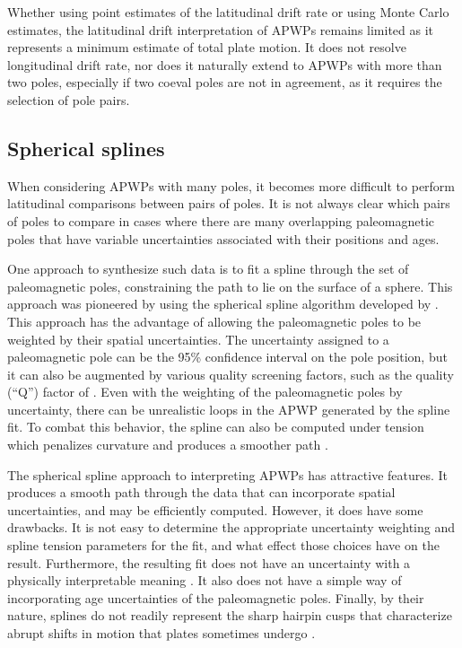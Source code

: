 \documentclass[]{agujournal2019}
\begin{document}
Whether using point estimates of the latitudinal drift rate or using Monte Carlo estimates, the latitudinal drift interpretation of APWPs remains limited as it represents a minimum estimate of total plate motion. It does not resolve longitudinal drift rate, nor does it naturally extend to APWPs with more than two poles, especially if two coeval poles are not in agreement, as it requires the selection of pole pairs.

\subsection{Spherical splines}
When considering APWPs with many poles, it becomes more difficult to perform latitudinal comparisons between pairs of poles. It is not always clear which pairs of poles to compare in cases where there are many overlapping paleomagnetic poles that have variable uncertainties associated with their positions and ages.

One approach to synthesize such data is to fit a spline through the set of paleomagnetic poles, constraining the path to lie on the surface of a sphere. This approach was pioneered by  using the spherical spline algorithm developed by . This approach has the advantage of allowing the paleomagnetic poles to be weighted by their spatial uncertainties. The uncertainty assigned to a paleomagnetic pole can be the 95\% confidence interval on the pole position, but it can also be augmented by various quality screening factors, such as the quality (``Q'') factor of  \cite{Torsvik1992a}. Even with the weighting of the paleomagnetic poles by uncertainty, there can be unrealistic loops in the APWP generated by the spline fit. To combat this behavior, the spline can also be computed under tension which penalizes curvature and produces a smoother path \cite{Torsvik1996a}.

The spherical spline approach to interpreting APWPs has attractive features. It produces a smooth path through the data that can incorporate spatial uncertainties, and may be efficiently computed. However, it does have some drawbacks. It is not easy to determine the appropriate uncertainty weighting and spline tension parameters for the fit, and what effect those choices have on the result. Furthermore, the resulting fit does not have an uncertainty with a physically interpretable meaning \cite{Torsvik1996a}. It also does not have a simple way of incorporating age uncertainties of the paleomagnetic poles. Finally, by their nature, splines do not readily represent the sharp hairpin cusps that characterize abrupt shifts in motion that plates sometimes undergo \cite{Irving1972a, Gordon1984a, Torsvik2012a}.
\end{document}
